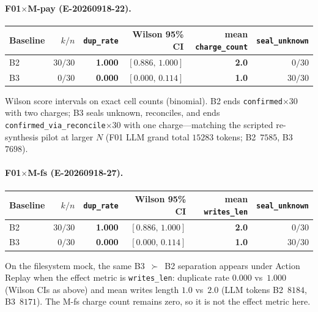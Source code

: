 \documentclass[11pt,a4paper]{article}
\begin{document}
\paragraph{F01$\times$M-pay (E-20260918-22).}
\begin{center}
\small
\begin{tabular}{@{}lrrrrr@{}}
\toprule
Baseline & $k/n$ & \texttt{dup\_rate} & Wilson 95\% CI &
  mean \texttt{charge\_count} & \texttt{seal\_unknown} \\
\midrule
B2 & $30/30$ & \textbf{1.000} & $[0.886,\,1.000]$ & \textbf{2.0} & $0/30$ \\
B3 & $0/30$ & \textbf{0.000} & $[0.000,\,0.114]$ & \textbf{1.0} & $30/30$ \\
\bottomrule
\end{tabular}
\end{center}
Wilson score intervals on exact cell counts (binomial). B2 ends
\texttt{confirmed}$\times$30 with two charges; B3 seals unknown,
reconciles, and ends \texttt{confirmed\_via\_reconcile}$\times$30 with one
charge---matching the scripted re-synthesis pilot at larger $N$
(F01 LLM grand total $15283$ tokens; B2~$7585$, B3~$7698$).

\paragraph{F01$\times$M-fs (E-20260918-27).}
\begin{center}
\small
\begin{tabular}{@{}lrrrrr@{}}
\toprule
Baseline & $k/n$ & \texttt{dup\_rate} & Wilson 95\% CI &
  mean \texttt{writes\_len} & \texttt{seal\_unknown} \\
\midrule
B2 & $30/30$ & \textbf{1.000} & $[0.886,\,1.000]$ & \textbf{2.0} & $0/30$ \\
B3 & $0/30$ & \textbf{0.000} & $[0.000,\,0.114]$ & \textbf{1.0} & $30/30$ \\
\bottomrule
\end{tabular}
\end{center}
On the filesystem mock, the same B3~$\succ$~B2 separation appears under
Action Replay when the effect metric is \texttt{writes\_len}: duplicate
rate $0.000$ vs~$1.000$ (Wilson CIs as above) and mean writes length
$1.0$ vs~$2.0$ (LLM tokens B2~$8184$, B3~$8171$). The M-fs charge
count remains zero, so it is not the effect metric here.
\end{document}
